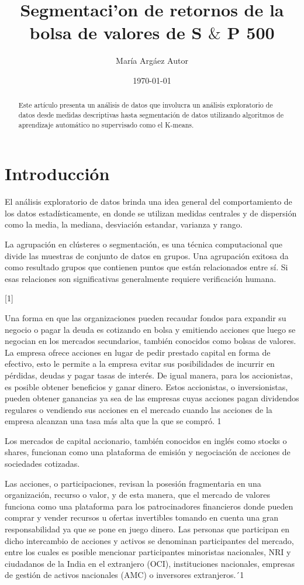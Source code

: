 \documentclass[a4paper]{article}
\title{Segmentaci'on de retornos de la bolsa de valores de S $\&$ P 500}
\author{Mar\'ia Arg\'aez Autor\corref{cor1}\fnref{label2}}
\date{\today}
\begin{document}
\begin{abstract}
Este art\'iculo presenta un an\'alisis de datos que involucra un an\'alisis exploratorio de datos desde medidas descriptivas hasta segmentaci\'on de datos utilizando algoritmos de aprendizaje autom\'atico no supervisado como el K-means. 
\end{abstract}


\section{Introducci\'on}

El an\'alisis exploratorio de datos brinda una idea general del comportamiento de los datos estad\'isticamente, en donde se utilizan medidas centrales y de dispersi\'on como la media, la mediana, desviaci\'on estandar, varianza y rango.


La agrupaci\'on en cl\'usteres o segmentaci\'on, es una t\'ecnica computacional que divide las muestras de conjunto de datos en grupos. Una agrupaci\'on exitosa da como resultado grupos que contienen puntos que est\'an relacionados entre s\'i. Si esas relaciones son significativas generalmente requiere verificaci\'on humana.

 

[1] 

Una forma en que las organizaciones pueden recaudar fondos para expandir su negocio o pagar la deuda es cotizando en bolsa y emitiendo acciones que luego se negocian en los mercados secundarios, también conocidos como bolsas de valores. La empresa ofrece acciones en lugar de pedir prestado capital en forma de efectivo, esto le permite a la empresa evitar sus posibilidades de incurrir en pérdidas, deudas y pagar tasas de interés. De igual manera, para los accionistas, es posible obtener beneficios y ganar dinero. Estos accionistas, o inversionistas, pueden obtener ganancias ya sea de las empresas cuyas acciones pagan dividendos regulares o vendiendo sus acciones en el mercado cuando las acciones de la empresa alcanzan una tasa más alta que la que se compró. {1} 

Los mercados de capital accionario, también conocidos en inglés como stocks o shares, funcionan como una plataforma de emisión y negociación de acciones de sociedades cotizadas. 

Las acciones, o participaciones, revisan la posesión fragmentaria en una organización, recurso o valor, y de esta manera, que el mercado de valores funciona como una plataforma para los patrocinadores financieros donde pueden comprar y vender recursos u ofertas invertibles tomando en cuenta una gran responsabilidad ya que se pone en juego dinero. Las personas que participan en dicho intercambio de acciones y activos se denominan participantes del mercado, entre los cuales es posible mencionar participantes minoristas nacionales, NRI y ciudadanos de la India en el extranjero (OCI), instituciones nacionales, empresas de gestión de activos nacionales (AMC) o inversores extranjeros.´{1} 
\end{document}
